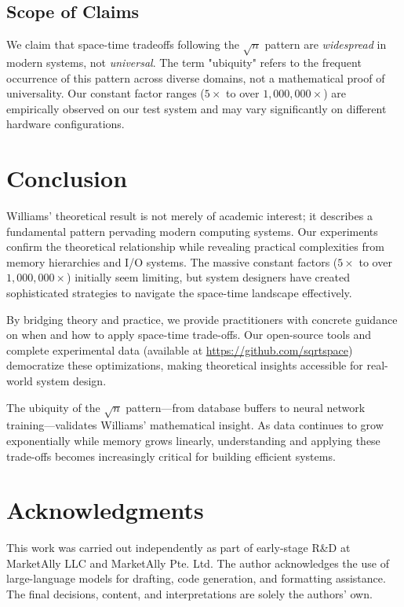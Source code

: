 \documentclass[11pt]{article}
\theoremstyle{definition}
\begin{document}
\subsection{Scope of Claims}

We claim that space-time tradeoffs following the $\sqrt{n}$ pattern are \emph{widespread} in modern systems, not \emph{universal}. The term "ubiquity" refers to the frequent occurrence of this pattern across diverse domains, not a mathematical proof of universality. Our constant factor ranges ($5\times$ to over $1{,}000{,}000\times$) are empirically observed on our test system and may vary significantly on different hardware configurations.

\section{Conclusion}

Williams' theoretical result is not merely of academic interest; it describes a fundamental pattern pervading modern computing systems. Our experiments confirm the theoretical relationship while revealing practical complexities from memory hierarchies and I/O systems. The massive constant factors ($5\times$ to over $1{,}000{,}000\times$) initially seem limiting, but system designers have created sophisticated strategies to navigate the space-time landscape effectively.

By bridging theory and practice, we provide practitioners with concrete guidance on when and how to apply space-time trade-offs. Our open-source tools and complete experimental data (available at \url{https://github.com/sqrtspace}) democratize these optimizations, making theoretical insights accessible for real-world system design.

The ubiquity of the $\sqrt{n}$ pattern---from database buffers to neural network training---validates Williams' mathematical insight. As data continues to grow exponentially while memory grows linearly, understanding and applying these trade-offs becomes increasingly critical for building efficient systems.

\section*{Acknowledgments}
This work was carried out independently as part of early-stage R\&D at MarketAlly LLC and MarketAlly Pte. Ltd. The author acknowledges the use of large-language models for drafting, code generation, and formatting assistance. The final decisions, content, and interpretations are solely the authors' own.

\newpage

\end{document}
